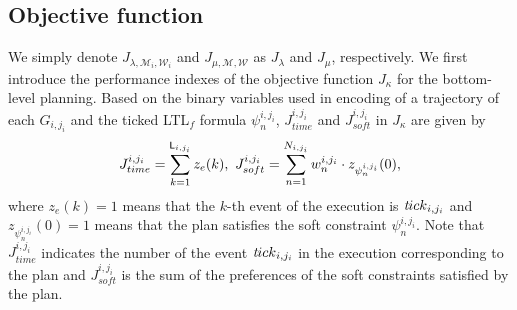 \documentclass[journal,twoside,web]{IEEEtran}
\newcommand{\ttick}{{\textit tick}}
\newcommand{\Len}{{\sf L}}
\newcommand{\M}{\mathcal{M}}
\newcommand{\W}{\mathcal{W}}
\begin{document}
\subsection{Objective function}
%
We simply denote $J_{\lambda,\M_i,\W_i}$ and $J_{\mu,\M,\W}$ as $J_{\lambda}$ and $J_{\mu}$, respectively.
We first introduce the performance indexes of the objective function $J_\kappa$ for the bottom-level planning. 
Based on the binary variables used in encoding of a trajectory of each $G_{i,j_i}$ and the ticked LTL${}_f$ formula $\psi^{i,j_i}_n$, $J_{time}^{i,j_i}$ and $J_{soft}^{i,j_i}$ in $J_{\kappa}$ are given by
\begin{align}\label{obj:1}
J_{time}^{i,j_i}=\sum_{k=1}^{\Len_{i,j_i}}z_e(k),~ J_{soft}^{i,j_i}=\sum_{n=1}^{N_{i,j_i}} w_{n}^{i,j_i}\cdot z_{\psi_{n}^{i,j_i}}(0), 
\end{align}
where $z_e(k)=1$ means that the $k$-th event of the execution is $\ttick_{i,j_i}$ and $z_{\psi_{n}^{i,j_i}}(0)=1$ means that the plan satisfies the soft constraint $\psi_{n}^{i,j_i}$.
Note that $J_{time}^{i,j_i}$ indicates the number of the event $\ttick_{i,j_i}$ in the execution corresponding to the plan and $J_{soft}^{i,j_i}$ is the sum of the preferences of the soft constraints satisfied by the plan. 
%
\end{document}
